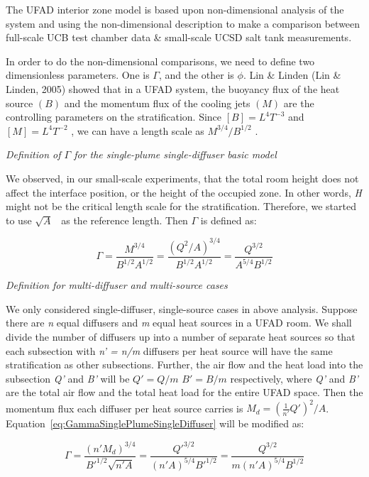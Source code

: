 {The UFAD interior zone model is based upon non-dimensional analysis of the system and using the non-dimensional description to make a comparison between full-scale UCB test chamber data \& small-scale UCSD salt tank measurements.

In order to do the non-dimensional comparisons, we need to define two dimensionless parameters. One is \(\Gamma\), and the other is \(\phi\). Lin \& Linden (Lin \& Linden, 2005) showed that in a UFAD system, the buoyancy flux of the heat source \((B)\) and the momentum flux of the cooling jets \((M)\) are the controlling parameters on the stratification. Since \([B] = {L^4}{T^{ - 3}}\) and\([M] = {L^4}{T^{ - 2}}\) , we can have a length scale as \({M^{3/4}}/{B^{1/2}}\) .

\emph{Definition of \(\Gamma\) for the single-plume single-diffuser basic model}

We observed, in our small-scale experiments, that the total room height does not affect the interface position, or the height of the occupied zone. In other words, \emph{H} might not be the critical length scale for the stratification. Therefore, we started to use \(\sqrt A\) ~as the reference length. Then \(\Gamma\) is defined as:

\begin{equation}
\Gamma  = \frac{{{M^{3/4}}}}{{{B^{1/2}}{A^{1/2}}}} = \frac{{{{({Q^2}/A)}^{3/4}}}}{{{B^{1/2}}{A^{1/2}}}} = \frac{{{Q^{3/2}}}}{{{A^{5/4}}{B^{1/2}}}}
\label{eq:GammaSinglePlumeSingleDiffuser}
\end{equation}

\emph{Definition for multi-diffuser and multi-source cases}

We only considered single-diffuser, single-source cases in above analysis. Suppose there are \emph{n} equal diffusers and \emph{m} equal heat sources in a UFAD room. We shall divide the number of diffusers up into a number of separate heat sources so that each subsection with \emph{n' = n/m} diffusers per heat source will have the same stratification as other subsections. Further, the air flow and the heat load into the subsection \emph{Q'} and \emph{B'} will be \(Q' = Q/m\) \(B' = B/m\) respectively, where \emph{Q'} and \emph{B'} are the total air flow and the total heat load for the entire UFAD space. Then the momentum flux each diffuser per heat source carries is \({M_d} = {(\frac{1}{{n'}}Q')^2}/A\). Equation~\ref{eq:GammaSinglePlumeSingleDiffuser} will be modified as:

\begin{equation}
\Gamma  = \frac{{{{(n'{M_d})}^{3/4}}}}{{B{'^{1/2}}\sqrt {n'A} }} = \frac{{Q{'^{3/2}}}}{{{{(n'A)}^{5/4}}B{'^{1/2}}}} = \frac{{{Q^{3/2}}}}{{m{{(n'A)}^{5/4}}{B^{1/2}}}}
\label{eq:GammaMultiDiffuserMultiSource}
\end{equation}

}
